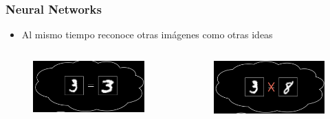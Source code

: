 \documentclass[10pt]{beamer}
\begin{document}
\begin{frame}
\frametitle{Neural Networks}
\begin{beamerboxesrounded}[upper=uppercolor, lower=lowercolor, shadow=true]{} 

\begin{itemize}
 \item Al mismo tiempo reconoce otras im\'agenes como otras ideas
    
\end{itemize}
\end{beamerboxesrounded}

\begin{columns}
\begin{column}{.5\textwidth}
 \begin{figure}
 \includegraphics[scale=0.2]{./Figures/tres_igual.png}
 \end{figure}  
\end{column}%

\begin{column}{.5\textwidth}
 \begin{figure}
 \includegraphics[scale=0.2]{./Figures/tres_ocho.png}  
 \end{figure}  
\end{column}%
\end{columns}

\end{frame}
\end{document}
